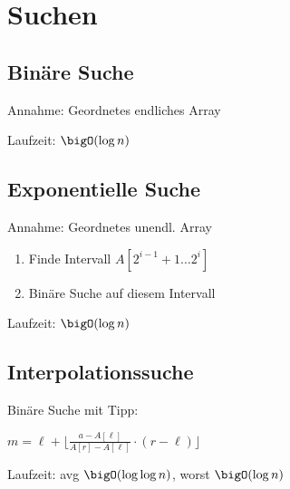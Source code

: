 \section*{Suchen}

\subsection*{Binäre Suche}
Annahme: Geordnetes endliches Array

Laufzeit: $\bigO(\log n)$

\subsection*{Exponentielle Suche}
Annahme: Geordnetes unendl. Array
\begin{enumerate}
	\item Finde Intervall $A[2^{i-1}+1 \ldots 2^i]$
	\item Binäre Suche auf diesem Intervall
\end{enumerate}
Laufzeit: $\bigO(\log n)$

\subsection*{Interpolationssuche}
Binäre Suche mit Tipp:

$m = \ell + \lfloor \frac{a-A[\ell]}{A[r]-A[\ell]}\cdot(r-\ell)\rfloor$

Laufzeit: avg $\bigO(\log \log n)$, worst $\bigO(\log n)$
